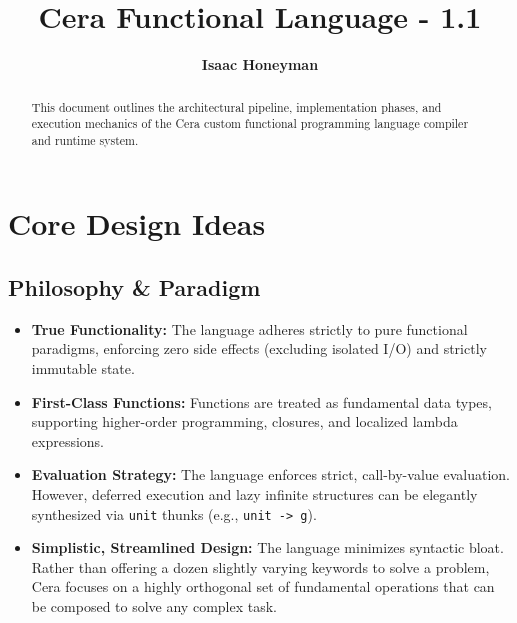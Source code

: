 \documentclass[11pt, a4paper]{article}
\title{\textbf{Cera Functional Language - 1.1}}
\author{\textbf{Isaac Honeyman}}
\begin{document}
\maketitle %

\begin{abstract}
\noindent This document outlines the architectural pipeline, implementation phases, and execution mechanics of the Cera custom functional programming language compiler and runtime system.
\end{abstract}

\tableofcontents
\newpage

\section{Core Design Ideas}

\subsection{Philosophy \& Paradigm}

\begin{itemize}
    \item \textbf{True Functionality:} The language adheres strictly to pure functional paradigms, enforcing zero side effects (excluding isolated I/O) and strictly immutable state.
    \item \textbf{First-Class Functions:} Functions are treated as fundamental data types, supporting higher-order programming, closures, and localized lambda expressions.
    \item \textbf{Evaluation Strategy:} The language enforces strict, call-by-value evaluation. However, deferred execution and lazy infinite structures can be elegantly synthesized via \texttt{unit} thunks (e.g., \texttt{unit -> g}).
    \item \textbf{Simplistic, Streamlined Design:} The language minimizes syntactic bloat. Rather than offering a dozen slightly varying keywords to solve a problem, Cera focuses on a highly orthogonal set of fundamental operations that can be composed to solve any complex task.
\end{itemize}
\end{document}
